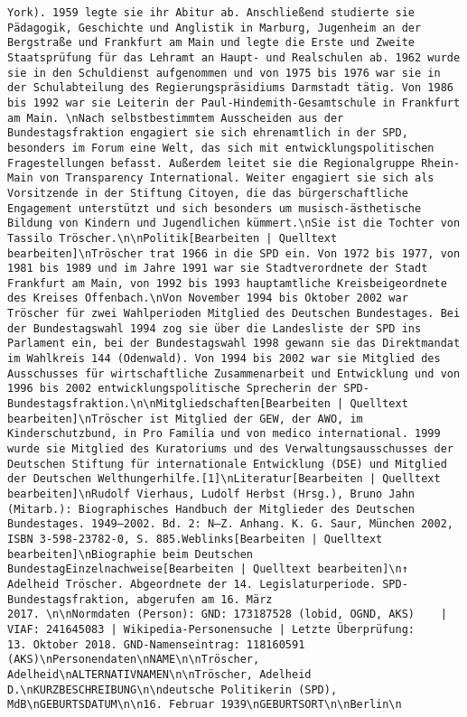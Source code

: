 \documentclass[
]{article}
\begin{document}
\begin{verbatim}
York). 1959 legte sie ihr Abitur ab. Anschließend studierte sie Pädagogik, Geschichte und Anglistik in Marburg, Jugenheim an der Bergstraße und Frankfurt am Main und legte die Erste und Zweite Staatsprüfung für das Lehramt an Haupt- und Realschulen ab. 1962 wurde sie in den Schuldienst aufgenommen und von 1975 bis 1976 war sie in der Schulabteilung des Regierungspräsidiums Darmstadt tätig. Von 1986 bis 1992 war sie Leiterin der Paul-Hindemith-Gesamtschule in Frankfurt am Main. \nNach selbstbestimmtem Ausscheiden aus der Bundestagsfraktion engagiert sie sich ehrenamtlich in der SPD, besonders im Forum eine Welt, das sich mit entwicklungspolitischen Fragestellungen befasst. Außerdem leitet sie die Regionalgruppe Rhein-Main von Transparency International. Weiter engagiert sie sich als Vorsitzende in der Stiftung Citoyen, die das bürgerschaftliche Engagement unterstützt und sich besonders um musisch-ästhetische Bildung von Kindern und Jugendlichen kümmert.\nSie ist die Tochter von Tassilo Tröscher.\n\nPolitik[Bearbeiten | Quelltext bearbeiten]\nTröscher trat 1966 in die SPD ein. Von 1972 bis 1977, von 1981 bis 1989 und im Jahre 1991 war sie Stadtverordnete der Stadt Frankfurt am Main, von 1992 bis 1993 hauptamtliche Kreisbeigeordnete des Kreises Offenbach.\nVon November 1994 bis Oktober 2002 war Tröscher für zwei Wahlperioden Mitglied des Deutschen Bundestages. Bei der Bundestagswahl 1994 zog sie über die Landesliste der SPD ins Parlament ein, bei der Bundestagswahl 1998 gewann sie das Direktmandat im Wahlkreis 144 (Odenwald). Von 1994 bis 2002 war sie Mitglied des Ausschusses für wirtschaftliche Zusammenarbeit und Entwicklung und von 1996 bis 2002 entwicklungspolitische Sprecherin der SPD-Bundestagsfraktion.\n\nMitgliedschaften[Bearbeiten | Quelltext bearbeiten]\nTröscher ist Mitglied der GEW, der AWO, im Kinderschutzbund, in Pro Familia und von medico international. 1999 wurde sie Mitglied des Kuratoriums und des Verwaltungsausschusses der Deutschen Stiftung für internationale Entwicklung (DSE) und Mitglied der Deutschen Welthungerhilfe.[1]\nLiteratur[Bearbeiten | Quelltext bearbeiten]\nRudolf Vierhaus, Ludolf Herbst (Hrsg.), Bruno Jahn (Mitarb.): Biographisches Handbuch der Mitglieder des Deutschen Bundestages. 1949–2002. Bd. 2: N–Z. Anhang. K. G. Saur, München 2002, ISBN 3-598-23782-0, S. 885.Weblinks[Bearbeiten | Quelltext bearbeiten]\nBiographie beim Deutschen BundestagEinzelnachweise[Bearbeiten | Quelltext bearbeiten]\n↑ Adelheid Tröscher. Abgeordnete der 14. Legislaturperiode. SPD-Bundestagsfraktion, abgerufen am 16. März 2017. \n\nNormdaten (Person): GND: 173187528 (lobid, OGND, AKS)    | VIAF: 241645083 | Wikipedia-Personensuche | Letzte Überprüfung: 13. Oktober 2018. GND-Namenseintrag: 118160591 (AKS)\nPersonendaten\nNAME\n\nTröscher, Adelheid\nALTERNATIVNAMEN\n\nTröscher, Adelheid D.\nKURZBESCHREIBUNG\n\ndeutsche Politikerin (SPD), MdB\nGEBURTSDATUM\n\n16. Februar 1939\nGEBURTSORT\n\nBerlin\n

\end{verbatim}
\end{document}
